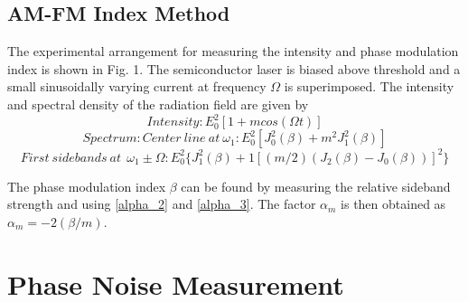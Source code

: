 \subsection{AM-FM Index Method}
The experimental arrangement for measuring the intensity and phase modulation index is shown in Fig. 1. The semiconductor laser is biased above threshold and a small sinusoidally varying current at frequency $\Omega$ is superimposed. The intensity and spectral density of the radiation field are given by
\begin{equation}
    Intensity: E_0^2[1+mcos(\Omega t)]
\end{equation}
\begin{equation}
    Spectrum: Center \ line \ at \ \omega_1: E_0^2[J_0^2(\beta)+m^2J_1^2(\beta)]
    \label{alpha_2}
\end{equation}
\begin{equation}
    First \ sidebands \ at \
    \ \omega_1 \pm \Omega: E_0^2\big\{J_1^2(\beta)+1[(m/2)(J_2(\beta)-J_0(\beta))]^2\big\}
    \label{alpha_3}
\end{equation}

The phase modulation index $\beta$ can be found by measuring the relative sideband strength and using \autoref{alpha_2} and \autoref{alpha_3}. The factor $\alpha_m$ is then obtained as $\alpha_m = -2(\beta/m)$.


\section{Phase Noise Measurement}

